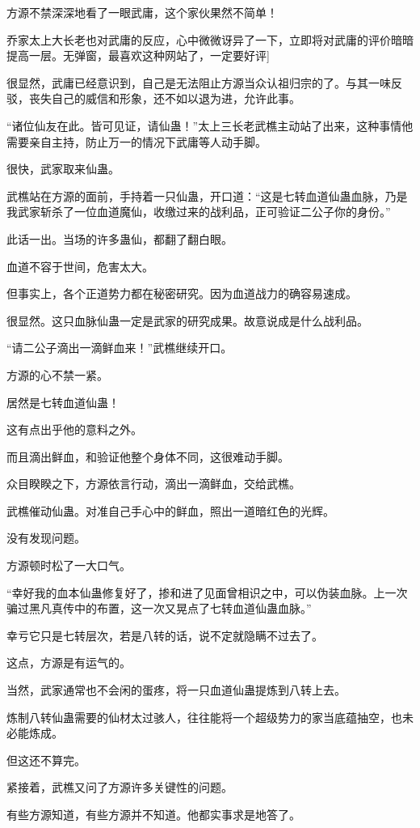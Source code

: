 \begin{this_body}
方源不禁深深地看了一眼武庸，这个家伙果然不简单！

乔家太上大长老也对武庸的反应，心中微微讶异了一下，立即将对武庸的评价暗暗提高一层。无弹窗，最喜欢这种网站了，一定要好评]

很显然，武庸已经意识到，自己是无法阻止方源当众认祖归宗的了。与其一味反驳，丧失自己的威信和形象，还不如以退为进，允许此事。

“诸位仙友在此。皆可见证，请仙蛊！”太上三长老武樵主动站了出来，这种事情他需要亲自主持，防止万一的情况下武庸等人动手脚。

很快，武家取来仙蛊。

武樵站在方源的面前，手持着一只仙蛊，开口道：“这是七转血道仙蛊血脉，乃是我武家斩杀了一位血道魔仙，收缴过来的战利品，正可验证二公子你的身份。”

此话一出。当场的许多蛊仙，都翻了翻白眼。

血道不容于世间，危害太大。

但事实上，各个正道势力都在秘密研究。因为血道战力的确容易速成。

很显然。这只血脉仙蛊一定是武家的研究成果。故意说成是什么战利品。

“请二公子滴出一滴鲜血来！”武樵继续开口。

方源的心不禁一紧。

居然是七转血道仙蛊！

这有点出乎他的意料之外。

而且滴出鲜血，和验证他整个身体不同，这很难动手脚。

众目睽睽之下，方源依言行动，滴出一滴鲜血，交给武樵。

武樵催动仙蛊。对准自己手心中的鲜血，照出一道暗红色的光辉。

没有发现问题。

方源顿时松了一大口气。

“幸好我的血本仙蛊修复好了，掺和进了见面曾相识之中，可以伪装血脉。上一次骗过黑凡真传中的布置，这一次又晃点了七转血道仙蛊血脉。”

幸亏它只是七转层次，若是八转的话，说不定就隐瞒不过去了。

这点，方源是有运气的。

当然，武家通常也不会闲的蛋疼，将一只血道仙蛊提炼到八转上去。

炼制八转仙蛊需要的仙材太过骇人，往往能将一个超级势力的家当底蕴抽空，也未必能炼成。

但这还不算完。

紧接着，武樵又问了方源许多关键性的问题。

有些方源知道，有些方源并不知道。他都实事求是地答了。


\end{this_body}
